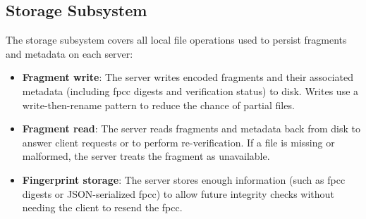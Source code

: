 \documentclass[../veristore_security_model.tex]{subfiles}
\begin{document}
\subsection{Storage Subsystem}

The storage subsystem covers all local file operations used to persist fragments and metadata on each server:
\begin{itemize}
    \item \textbf{Fragment write}: The server writes encoded fragments and their associated metadata (including fpcc digests and verification status) to disk. Writes use a write-then-rename pattern to reduce the chance of partial files.
    \item \textbf{Fragment read}: The server reads fragments and metadata back from disk to answer client requests or to perform re-verification. If a file is missing or malformed, the server treats the fragment as unavailable.
    \item \textbf{Fingerprint storage}: The server stores enough information (such as fpcc digests or JSON-serialized fpcc) to allow future integrity checks without needing the client to resend the fpcc.
\end{itemize}

\newpage
\end{document}
